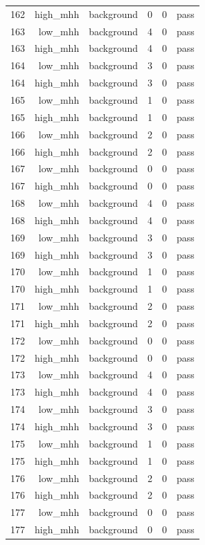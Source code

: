 \begin{table}[htbp]
{\begin{tabular}{lrrrrr}
162 & high\_mhh & background & 0 & 0 & pass \\
163 & low\_mhh & background & 4 & 0 & pass \\
163 & high\_mhh & background & 4 & 0 & pass \\
164 & low\_mhh & background & 3 & 0 & pass \\
164 & high\_mhh & background & 3 & 0 & pass \\
165 & low\_mhh & background & 1 & 0 & pass \\
165 & high\_mhh & background & 1 & 0 & pass \\
166 & low\_mhh & background & 2 & 0 & pass \\
166 & high\_mhh & background & 2 & 0 & pass \\
167 & low\_mhh & background & 0 & 0 & pass \\
167 & high\_mhh & background & 0 & 0 & pass \\
168 & low\_mhh & background & 4 & 0 & pass \\
168 & high\_mhh & background & 4 & 0 & pass \\
169 & low\_mhh & background & 3 & 0 & pass \\
169 & high\_mhh & background & 3 & 0 & pass \\
170 & low\_mhh & background & 1 & 0 & pass \\
170 & high\_mhh & background & 1 & 0 & pass \\
171 & low\_mhh & background & 2 & 0 & pass \\
171 & high\_mhh & background & 2 & 0 & pass \\
172 & low\_mhh & background & 0 & 0 & pass \\
172 & high\_mhh & background & 0 & 0 & pass \\
173 & low\_mhh & background & 4 & 0 & pass \\
173 & high\_mhh & background & 4 & 0 & pass \\
174 & low\_mhh & background & 3 & 0 & pass \\
174 & high\_mhh & background & 3 & 0 & pass \\
175 & low\_mhh & background & 1 & 0 & pass \\
175 & high\_mhh & background & 1 & 0 & pass \\
176 & low\_mhh & background & 2 & 0 & pass \\
176 & high\_mhh & background & 2 & 0 & pass \\
177 & low\_mhh & background & 0 & 0 & pass \\
177 & high\_mhh & background & 0 & 0 & pass \\

\end{tabular}}
\end{table}
